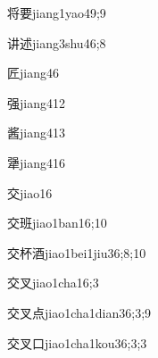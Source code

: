 \begin{verbete}{将要}{jiang1yao4}{9;9}
\end{verbete}

\begin{verbete}{讲述}{jiang3shu4}{6;8}
\end{verbete}

\begin{verbete}{匠}{jiang4}{6}
\end{verbete}

\begin{verbete}{强}{jiang4}{12}
\end{verbete}

\begin{verbete}{酱}{jiang4}{13}
\end{verbete}

\begin{verbete}{犟}{jiang4}{16}
\end{verbete}

\begin{verbete}{交}{jiao1}{6}
\end{verbete}

\begin{verbete}{交班}{jiao1ban1}{6;10}
\end{verbete}

\begin{verbete}{交杯酒}{jiao1bei1jiu3}{6;8;10}
\end{verbete}

\begin{verbete}{交叉}{jiao1cha1}{6;3}
\end{verbete}

\begin{verbete}{交叉点}{jiao1cha1dian3}{6;3;9}
\end{verbete}

\begin{verbete}{交叉口}{jiao1cha1kou3}{6;3;3}
\end{verbete}

